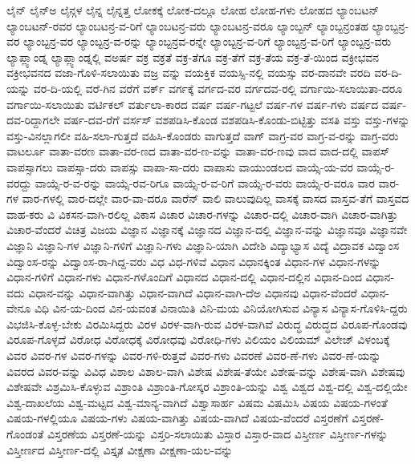 {ಲೈನ್
ಲೈನ್ಅ
ಲೈನ್ಗಳ
ಲೈನ್ನ
ಲೈನ್ನತ್ತ
ಲೋಕಕ್ಕೆ
ಲೋಕ-ದಲ್ಲೂ
ಲೋಹ
ಲೋಹ-ಗಳು
ಲೋಹದ
ಲ್ಯಾಂಬಟನ್
ಲ್ಯಾಂಬಟನ್-ರವರ
ಲ್ಯಾಂಬಟನ್ರ-ವ-ರಿಗೆ
ಲ್ಯಾಂಬಟನ್ರ-ವರು
ಲ್ಯಾಂಬಟನ್ರ-ವರೂ
ಲ್ಯಾಂಬ್ಟನ್
ಲ್ಯಾಂಬ್ಟನ್ರಂತಹ
ಲ್ಯಾಂಬ್ಟನ್ರ-ವರ
ಲ್ಯಾಂಬ್ಟನ್ರ-ವರ
ಲ್ಯಾಂಬ್ಟನ್ರ-ವ-ರನ್ನು
ಲ್ಯಾಂಬ್ಟನ್ರವ-ರನ್ನೇ
ಲ್ಯಾಂಬ್ಟನ್ರ-ವ-ರಿಗೆ
ಲ್ಯಾಂಬ್ಟನ್ರ-ವ-ರಿಗೆ
ಲ್ಯಾಂಬ್ಟನ್ರ-ವರು
ಲ್ಯಾಪ್ಲ್ಯಾಂಡ್ನ
ಲ್ಯಾಪ್ಲ್ಯಾಂಡ್ನಲ್ಲಿ
ವಅರ್ಷ
ವಕ್ರ
ವಕ್ರತೆ
ವಕ್ರ-ತೆಗೂ
ವಕ್ರ-ತೆಗೆ
ವಕ್ರ-ತೆಯ
ವಕ್ರ-ತೆ-ಯಿಂದ
ವಕ್ರೀಭವನ
ವಕ್ರೀಭವನದ
ವಜಾ-ಗೊಳಿ-ಸಲಾಯಿತು
ವಜ್ರ
ವನ್ನು
ವಯಕ್ತಿಕ
ವಯಸ್ಸಿ-ನಲ್ಲಿ
ವಯಸ್ಸು
ವರ-ದಾನವೇ
ವರದಿ
ವರ-ದಿ-ಯನ್ನು
ವರ-ದಿ-ಯಲ್ಲಿ
ವರೆ-ಗಿನ
ವರೆಗೆ
ವರ್ಕ್
ವರ್ಗಕ್ಕೆ
ವರ್ಗದ-ವರ
ವರ್ಗದವ-ರಲ್ಲಿ
ವರ್ಗಾಯಿ-ಸಲಾಯಿತಾ-ದರೂ
ವರ್ಗಾಯಿ-ಸಲಾಯಿತು
ವರ್ಟಿಕಲ್
ವರ್ತುಲಾ-ಕಾರದ
ವರ್ಷ
ವರ್ಷ-ಗಟ್ಟಲೆ
ವರ್ಷ-ಗಳ
ವರ್ಷ-ಗಳು
ವರ್ಷದ
ವರ್ಷ-ದವ-ರಿದ್ದಾಗಲೇ
ವರ್ಷ-ದವ-ರೆಗೆ
ವರ್ಸಸ್
ವಶಪಡಿಸಿ-ಕೊಂಡ
ವಶಪಡಿಸಿ-ಕೊಂಡು-ಬಿಟ್ಟಿತ್ತು
ವಸತಿ
ವಸ್ತು
ವಸ್ತು-ಗಳನ್ನು
ವಸ್ತು-ವಿನಲ್ಲಾಗಲೀ
ವಹಿ-ಸಲಾ-ಗುತ್ತದೆ
ವಹಿಸಿ-ಕೊಂಡರು
ವಾಗುತ್ತದೆ
ವಾಗ್
ವಾಗ್ರ-ವರ
ವಾಗ್ರ-ವ-ರನ್ನು
ವಾಗ್ರ-ವರು
ವಾಟರ್ಲೂ
ವಾತಾ-ವರಣ
ವಾತಾ-ವರ-ಣದ
ವಾತಾ-ವರ-ಣ-ವನ್ನು
ವಾತಾ-ವರ-ಣವು
ವಾದ
ವಾದ-ದಲ್ಲಿ
ವಾಪಸ್
ವಾಪಸ್ಸಾಗಲು
ವಾಪಸ್ಸಾ-ದರು
ವಾಪಸ್ಸು
ವಾಪಾ-ಸಾ-ದರು
ವಾಪಾಸು
ವಾಯುಂಡಲದ
ವಾಯ್ಸೆ-ಯ-ವರ
ವಾಯ್ಸೆ-ರ-ವರದ್ದು
ವಾಯ್ಸೆ-ರ-ವ-ರನ್ನು
ವಾಯ್ಸೆ-ರವ-ರಿಗೂ
ವಾಯ್ಸೆ-ರ-ವ-ರಿಗೆ
ವಾಯ್ಸೆ-ರ-ವರು
ವಾಯ್ಸೆ-ರ-ವರೂ
ವಾರ
ವಾರ-ಗಳ
ವಾರ-ಗಳಲ್ಲಿ
ವಾರ-ದಲ್ಲೇ
ವಾರ-ವಾ-ದರೂ
ವಾರೆನ್
ವಾಲಿ
ವಾಲುವುದಿಲ್ಲ
ವಾಸಕ್ಕೆ
ವಾಸದ
ವಾಸ್ತವ-ತೆಗೆ
ವಾಸ್ತವದ
ವಾಹ-ಕರು
ವಿ
ವಿಕಸನ-ವಾಗಿ-ರಲಿಲ್ಲ
ವಿಕಾಸ
ವಿಚಾರ
ವಿಚಾರ-ಗಳನ್ನು
ವಿಚಾರ-ದಲ್ಲಿ
ವಿಚಾರ-ವಾಗಿ
ವಿಚಾರ-ವಾಗಿತ್ತು
ವಿಚಾರ-ವೆಂದರೆ
ವಿಚಿತ್ರ
ವಿಜಯ
ವಿಜ್ಞಾನ
ವಿಜ್ಞಾನಕ್ಕೆ
ವಿಜ್ಞಾನದ
ವಿಜ್ಞಾನ-ದಲ್ಲಿ
ವಿಜ್ಞಾನ-ವನ್ನು
ವಿಜ್ಞಾನವೂ
ವಿಜ್ಞಾನವೇ
ವಿಜ್ಞಾನಿ
ವಿಜ್ಞಾನಿ-ಗಳ
ವಿಜ್ಞಾನಿ-ಗಳಿಗೆ
ವಿಜ್ಞಾನಿ-ಗಳು
ವಿಜ್ಞಾನಿ-ಯಾಗಿ
ವಿದೇಶಿ
ವಿದ್ಯಾಭ್ಯಾಸ
ವಿದ್ಯೆ
ವಿದ್ರಾವಕ
ವಿದ್ವಾಂಸ
ವಿದ್ವಾಂಸ-ರನ್ನು
ವಿದ್ವಾಂಸ-ರಾ-ಗಿದ್ದ-ವರು
ವಿಧ
ವಿಧ-ಗಳಿವೆ
ವಿಧಾನ
ವಿಧಾನಕ್ಕಿಂತ
ವಿಧಾನ-ಗಳ
ವಿಧಾನ-ಗಳನ್ನು
ವಿಧಾನ-ಗಳಿಗೆ
ವಿಧಾನ-ಗಳು
ವಿಧಾನ-ಗಳೊಂದಿಗೆ
ವಿಧಾನದ
ವಿಧಾನ-ದಲ್ಲಿ
ವಿಧಾನ-ದಲ್ಲಿನ
ವಿಧಾನ-ದಿಂದ
ವಿಧಾನ-ವದು
ವಿಧಾನ-ವನ್ನು
ವಿಧಾನ-ವಾಗಿತ್ತು
ವಿಧಾನ-ವಾಗಿದೆ
ವಿಧಾನ-ವಾಗಿ-ದೆಅ
ವಿಧಾನವು
ವಿಧಾನ-ವೆಂದರೆ
ವಿಧಾನ-ವೇನೂ
ವಿಧಿ
ವಿನ-ಯ-ದಿಂದ
ವಿನ-ಯವಂತ
ವಿನಾಯಿತಿ
ವಿನಿ-ಮಯ
ವಿನಿಯೋಗಿಸುವ
ವಿನ್ಯಾಸ
ವಿನ್ಯಾಸ-ಗೊಳಿಸಿ-ದ್ದರು
ವಿಭಜಿಸಿ-ಕೊಳ್ಳ-ಬೇಕು
ವಿರಮಿಸಿದ್ದರು
ವಿರಳ
ವಿರಳ-ವಾಗಿ-ರುವ
ವಿರಳ-ವಾಗಿವೆ
ವಿರುದ್ಧ
ವಿರುದ್ಧದ
ವಿರೂಪ-ಗೊಂಡವು
ವಿರೂಪ-ಗೊಳ್ಳದೆ
ವಿರೋಧ
ವಿರೋಧಕ್ಕೆ
ವಿರೋಧವು
ವಿರೋಧಿ-ಗಳು
ವಿಲಿಯಂ
ವಿಲಿಯಮ್
ವಿಲೇಜ್
ವಿಳಂಬಕ್ಕೆ
ವಿವರ
ವಿವರ-ಗಳ
ವಿವರ-ಗಳನ್ನು
ವಿವರ-ಗಳಿ-ರುತ್ತವೆ
ವಿವರ-ಗಳು
ವಿವರಣೆ
ವಿವರ-ಣೆ-ಗಳು
ವಿವರ-ಣೆ-ಯನ್ನು
ವಿವರದ
ವಿವರ-ವನ್ನು
ವಿವಿಧ
ವಿಶಾಲ
ವಿಶಾಲ-ವಾಗಿ
ವಿಶೇಷ
ವಿಶೇಷ-ತೆಯೇ
ವಿಶೇಷ-ವನ್ನು
ವಿಶೇಷ-ವಾಗಿ
ವಿಶೇಷವು
ವಿಶೇಷವೇ
ವಿಶ್ರಮಿಸಿ-ಕೊಳ್ಳುವ
ವಿಶ್ರಾಂತಿ
ವಿಶ್ರಾಂತಿ-ಗೋಸ್ಕರ
ವಿಶ್ರಾಂತಿ-ಯನ್ನು
ವಿಶ್ವ
ವಿಶ್ವದ
ವಿಶ್ವ-ದಲ್ಲಿ
ವಿಶ್ವ-ದಲ್ಲಿಯೇ
ವಿಶ್ವ-ದಾಖಲೆಯ
ವಿಶ್ವ-ಮಟ್ಟದ
ವಿಶ್ವ-ಮಾನ್ಯ-ವಾಗಿದೆ
ವಿಶ್ವಾಸಾರ್ಹ
ವಿಷಮ
ವಿಷಮಿಸಿ
ವಿಷಯ
ವಿಷಯ-ಗಳಂತೆ
ವಿಷಯ-ಗಳಲ್ಲಿಯೂ
ವಿಷಯ-ಗಳು
ವಿಷಯ-ವಾಗಿತ್ತು
ವಿಷಯ-ವಾಗಿದೆ
ವಿಷಯ-ವೆಂದರೆ
ವಿಸ್ತರಣೆಗೆ
ವಿಸ್ತರಣೆ-ಗೊಂಡಂತೆ
ವಿಸ್ತರಣೆಯ
ವಿಸ್ತರಣೆ-ಯನ್ನು
ವಿಸ್ತರಿ-ಸಲಾಯಿತು
ವಿಸ್ತಾರ
ವಿಸ್ತಾರ-ವಾದ
ವಿಸ್ತೀರ್ಣ
ವಿಸ್ತೀರ್ಣ-ಗಳನ್ನು
ವಿಸ್ತೀರ್ಣದ
ವಿಸ್ತೀರ್ಣ-ದಲ್ಲಿ
ವಿಸ್ತೃತ
ವೀಕ್ಷಣಾ
ವೀಕ್ಷಣಾ-ಯಲ-ವನ್ನು
}
